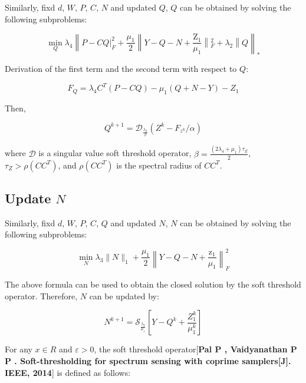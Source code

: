 \documentclass[final,3p,times]{elsarticle}
\begin{document}
Similarly, fixd $d$, $W$, $P$, $C$, $N$ and updated $Q$, $Q$ can be obtained by solving the following subproblems:

\begin{equation}
	\min _{Q} \lambda_{4}\left\|P-\left.C Q\right|_{F} ^{2}+\frac{\mu_1}{2}\right\| Y-Q-N+\left.\frac{\mathrm{Z}_1}{\mu_1}\left\|_{F}^{2}+\lambda_{2}\right\|Q\right\|_{*}
\end{equation}

Derivation of the first term and the second term with respect to $Q$:

\begin{equation}
	F_{Q}=\lambda_{4}C^{T}(P-C Q)-\mu_{1}(Q+N-Y)-Z_{1}
\end{equation}

Then, 

\begin{equation}
	Q^{k+1}=\mathcal{D}_{\frac{\lambda_{2}}{\beta}}\left(Z^{k}-F_{z^{k}} / \alpha\right)
\end{equation}

\noindent where $\mathcal{D}$ is a singular value soft threshold operator, $\beta=\frac{\left(2 \lambda_{4}+\mu_{1}\right) \tau_{Z}}{2}$, $\tau_{Z}>\rho\left(C C^{T}\right)$, and $\rho\left(C C^{T}\right)$ is the spectral radius of $C C^{T}$.

\subsection{Update $N$}

Similarly, fixd $d$, $W$, $P$, $C$, $Q$ and updated $N$, $N$ can be obtained by solving the following subproblems:

\begin{equation}
	\min _{N} \lambda_{3}\|N\|_{1}+\frac{\mu_{1}}{2}\left\|Y-Q-N+\frac{\mathrm{z}_{1}}{\mu_{1}}\right\|_{F}^{2}
\end{equation}

The above formula can be used to obtain the closed solution by the soft threshold operator. Therefore, $N$ can be updated by:

\begin{equation}
	N^{k+1}=\mathcal{S}_{\frac{\lambda_{3}}{\mu_{1}}}\left[Y-Q^{k}+\frac{Z_{1}^{k}}{\mu_{1}^{k}}\right]
\end{equation}

For any $x \in R$ and $\varepsilon >0$, the soft threshold operator[\textbf{Pal P , Vaidyanathan P P . Soft-thresholding for spectrum sensing with coprime samplers[J]. IEEE, 2014}] is defined as follows:
\end{document}

